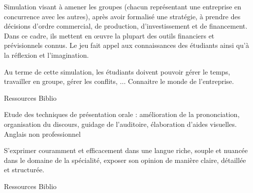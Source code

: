 \documentclass[10pt, a5paper]{report}
\begin{document}
\vfill

{
Simulation visant à amener les groupes (chacun représentant une entreprise en concurrence avec les autres), après avoir formalisé une stratégie, 
à prendre des décisions d'ordre commercial, de production, d'investissement et de financement. Dans ce cadre, ils mettent en \oe uvre la 
plupart des outils financiers et prévisionnels connus. 
} 
{Le jeu fait appel aux connaissances des étudiants ainsi qu'à la réflexion et l'imagination.} 
{\begin{itemize} 
  \ObjItem Au terme de cette simulation, les étudiants doivent pouvoir gérer le temps, travailler en groupe, gérer les conflits, ... 
  \ObjItem Connaitre le monde de l'entreprise.
\end{itemize} 
} 
{Ressources} 
{Biblio} 
 
\vfill

{
Etude des techniques de présentation orale : amélioration de la prononciation, organisation du discours, guidage de l'auditoire, élaboration d'aides visuelles. 
} 
{Anglais non professionnel} 
{\begin{itemize} 
  \ObjItem S'exprimer couramment et efficacement dans une langue riche, souple et nuancée dans le domaine de la spécialité, exposer son opinion de manière claire, détaillée et structurée.
\end{itemize} 
} 
{Ressources} 
{Biblio} 
 
\end{document}
